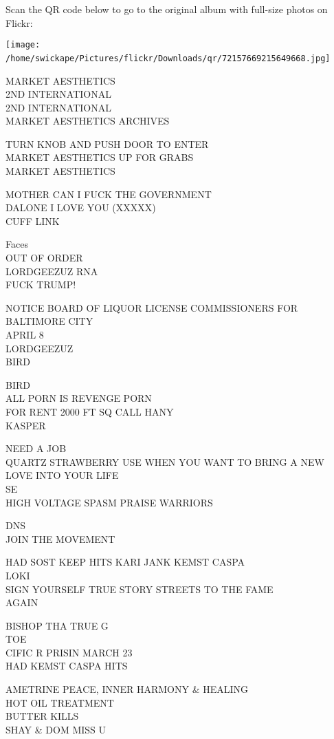 \documentclass[10pt,letterpaper]{article}
\begin{document}
Scan the QR code below to go to the original album with full-size photos on Flickr:

\texttt{[image: /home/swickape/Pictures/flickr/Downloads/qr/72157669215649668.jpg]}
\

MARKET AESTHETICS\\
2ND INTERNATIONAL\\
2ND INTERNATIONAL\\
MARKET AESTHETICS ARCHIVES

TURN KNOB AND PUSH DOOR TO ENTER\\
MARKET AESTHETICS UP FOR GRABS\\
MARKET AESTHETICS

MOTHER CAN I FUCK THE GOVERNMENT\\
DALONE I LOVE YOU (XXXXX)\\
CUFF LINK

Faces\\
OUT OF ORDER\\
LORDGEEZUZ RNA\\
FUCK TRUMP!

NOTICE BOARD OF LIQUOR LICENSE COMMISSIONERS FOR BALTIMORE CITY\\
APRIL 8\\
LORDGEEZUZ\\
BIRD

BIRD\\
ALL PORN IS REVENGE PORN\\
FOR RENT 2000 FT SQ CALL HANY\\
KASPER

NEED A JOB\\
QUARTZ STRAWBERRY USE WHEN YOU WANT TO BRING A NEW LOVE INTO YOUR LIFE\\
SE\\
HIGH VOLTAGE SPASM PRAISE WARRIORS

DNS\\
JOIN THE MOVEMENT

HAD SOST KEEP HITS KARI JANK KEMST CASPA\\
LOKI\\
SIGN YOURSELF TRUE STORY STREETS TO THE FAME\\
AGAIN

BISHOP THA TRUE G\\
TOE\\
CIFIC R PRISIN MARCH 23\\
HAD KEMST CASPA HITS

AMETRINE PEACE, INNER HARMONY \& HEALING\\
HOT OIL TREATMENT\\
BUTTER KILLS\\
SHAY \& DOM MISS U
\end{document}
